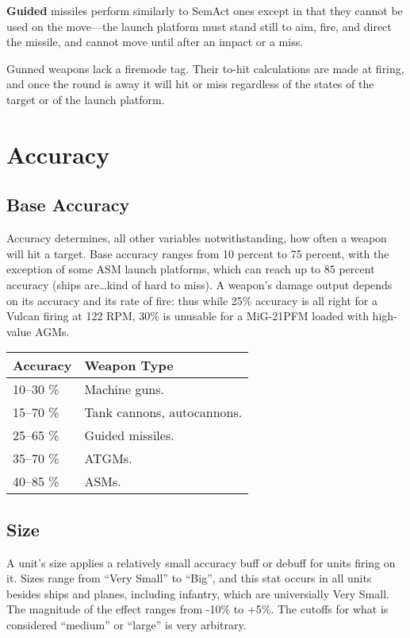 \documentclass{article}
\begin{document}
\textbf{Guided} missiles perform similarly to SemAct ones except in that they
cannot be used on the move---the launch platform must stand still to aim, fire,
and direct the missile, and cannot move until after an impact or a miss.

Gunned weapons lack a firemode tag. Their to-hit calculations are made at
firing, and once the round is away it will hit or miss regardless of the states
of the target or of the launch platform.

\section{Accuracy}
\subsection{Base Accuracy}

Accuracy determines, all other variables notwithstanding, how often a weapon
will hit a target. Base accuracy ranges from 10 percent to 75 percent, with the
exception of some ASM launch platforms, which can reach up to 85 percent
accuracy (ships are\ldots kind of hard to miss). A weapon's damage output
depends on its accuracy and its rate of fire: thus while 25\% accuracy is all
right for a Vulcan firing at 122 RPM, 30\% is unusable for a MiG-21PFM loaded
with high-value AGMs.

\begin{center}
    \begin{tabular}{ | l | l | }
    \hline
    Accuracy & Weapon Type \\ \hline
    10--30 \% & Machine guns.\\
    15--70 \% & Tank cannons, autocannons.\\
    25--65 \% & Guided missiles.\\
    35--70 \% & ATGMs.\\
    40--85 \% & ASMs. \\
    \hline
    \end{tabular}
\end{center}

\subsection{Size}

A unit's size applies a relatively small accuracy buff or debuff for units
firing on it. Sizes range from ``Very Small'' to ``Big'', and this stat occurs
in all units besides ships and planes, including infantry, which are
universially Very Small. The magnitude of the effect ranges from -10\% to
+5\%. The cutoffs for what is considered ``medium'' or ``large'' is very
arbitrary.
\end{document}
